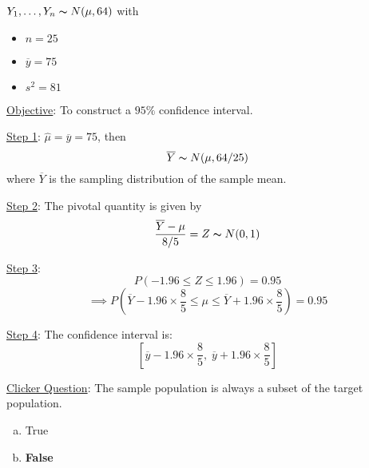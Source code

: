 \begin{exbox}
    \begin{example}
        $ Y_1,\ldots ,Y_n \thicksim N(\mu,64) $ with
        \begin{itemize}
            \item $ n=25 $
            \item $ \overline{y}=75 $
            \item $ s^2=81 $
        \end{itemize}
        \underline{Objective}: To construct a $ 95\% $ confidence interval.

        \underline{Step 1}: $ \hat{\mu}=\overline{y}=75 $, then
        \[ \overline{Y} \thicksim N(\mu,64/25) \]
        where $ \overline{Y} $ is the sampling distribution of the sample mean.

        \underline{Step 2}: The pivotal quantity is given by
        \[ \frac{\overline{Y}-\mu}{8/5} =Z \thicksim N(0,1) \]

        \underline{Step 3}:
        \[ P\left(-1.96\leqslant Z\leqslant 1.96\right)=0.95 \]
        \[ \implies P\left( \overline{Y}-1.96\times \frac{8}{5} \leqslant \mu
            \leqslant \overline{Y}+1.96\times \frac{8}{5} \right)=0.95 \]

        \underline{Step 4}: The confidence interval is:
        \[ \left[ \overline{y}-1.96\times \frac{8}{5},\;\overline{y}+1.96\times \frac{8}{5} \right] \]
    \end{example}
\end{exbox}

\underline{Clicker Question}: The sample population is always a subset of the target
population.
\begin{enumerate}[(a)]
    \item True
    \item \textbf{False}
\end{enumerate}
